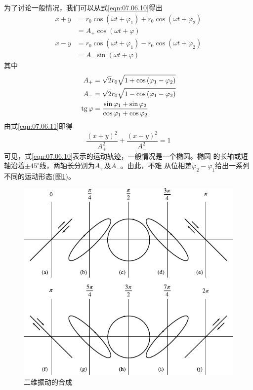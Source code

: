 为了讨论一般情况，我们可以从式\eqref{eqn:07.06.10}得出
\begin{equation}\label{eqn:07.06.11}
  \begin{split}
    x + y &= r _ { 0 }  \cos \left( \omega t + \varphi _ { 1 } \right) + r _ { 0 }  \cos \left( \omega t +  \varphi _ { 2 } \right)  \\[-0.5em]
    &= A _ { + }  \cos \left( \omega t + \varphi \right) \\
    x - y &= r _ { 0 }  \cos \left( \omega t +  \varphi _ { 1 } \right) - r _ { 0 }  \cos \left( \omega t +  \varphi _ { 2 } \right)  \\[-0.5em]
    &= A _ { - }  \sin \left( \omega t + \varphi \right)
  \end{split}
\end{equation}
其中\vspace{-1.56em}
\begin{equation}\label{eqn:07.06.12}
  \begin{split}
    A _ { + } &= \sqrt { 2 } r _ { 0 } \sqrt { 1 + \cos \left( \varphi _ { 1 } -  \varphi _ { 2 } \right) }  \\
    A _ { - } &= \sqrt { 2 } r _ { 0 } \sqrt { 1 - \cos \left( \varphi _ { 1 } -  \varphi _ { 2 } \right) } \\
    \operatorname{tg} \varphi &= \frac { \sin \varphi _ { 1 } + \sin \varphi _ { 2 } } { \cos \varphi _ { 1 } + \cos \varphi _ { 2 } }
  \end{split}
\end{equation}
由式\eqref{eqn:07.06.11}即得
\begin{equation*}
  \frac { \left( x + y \right) ^ { 2 } } { A _ { + } ^ { 2 } } + \frac { \left( x - y \right) ^ { 2 } } { A _ { - } ^ { 2 } } = 1
\end{equation*}
可见，式\eqref{eqn:07.06.10}表示的运动轨迹，一般情况是一个椭圆。椭圆
的长轴或短轴沿着$ \pm 45 ^ { \circ } $线，两轴长分别为$ A _ { + } $及$ A _ { - } $。由此，不难
从位相差$ \varphi_{ 2 } - \varphi_{ 1 } $给出一系列不同的运动形态(图\ref{fig:07.12})。\vspace{1.56em}
\begin{figure}[h]
  \centering
  \includegraphics{figure/fig07.12}
  \caption{二维振动的合成}
  \label{fig:07.12}
\end{figure}
